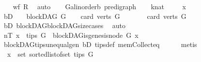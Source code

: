 \begin{isabellebody}
\ \ \isamarkupfalse%
\ {\isachardoublequoteopen}wf\ {\isacharquery}{\kern0pt}R{\isachardoublequoteclose}\ \isamarkupfalse%
\ auto\isanewline
{}\isamarkupfalse%
\isanewline
\ \ \isamarkupfalse%
\ G{\isacharcolon}{\kern0pt}{\isacharcolon}{\kern0pt}{\isachardoublequoteopen}{\isacharparenleft}{\kern0pt}{\isacharprime}{\kern0pt}a{\isacharcolon}{\kern0pt}{\isacharcolon}{\kern0pt}linorder{\isacharcomma}{\kern0pt}{\isacharprime}{\kern0pt}b{\isacharparenright}{\kern0pt}\ pre{\isacharunderscore}{\kern0pt}digraph{\isachardoublequoteclose}\isanewline
\ \ \isamarkupfalse%
\ k{\isacharcolon}{\kern0pt}{\isacharcolon}{\kern0pt}nat\ \isanewline
\ \ \isamarkupfalse%
\ x\isanewline
\ \ \isamarkupfalse%
\ bD{\isacharcolon}{\kern0pt}\ \ {\isachardoublequoteopen}{\isasymnot}\ {\isasymnot}\ blockDAG\ G{\isachardoublequoteclose}\isanewline
\ \ \isamarkupfalse%
\ {\isachardoublequoteopen}card\ {\isacharparenleft}{\kern0pt}verts\ G{\isacharparenright}{\kern0pt}\ {\isasymnoteq}\ {}{\isachardoublequoteclose}\isanewline
\ \ \isamarkupfalse%
\ \isamarkupfalse%
\ {\isachardoublequoteopen}card\ {\isacharparenleft}{\kern0pt}verts\ G{\isacharparenright}{\kern0pt}\ {\isachargreater}{\kern0pt}\ {}{\isachardoublequoteclose}\ \isamarkupfalse%
\ bD\ blockDAG{\isachardot}{\kern0pt}blockDAG{\isacharunderscore}{\kern0pt}size{\isacharunderscore}{\kern0pt}cases\ \isamarkupfalse%
\ auto\ \isanewline
\ \ \isamarkupfalse%
\ \isamarkupfalse%
\ nT{\isacharcolon}{\kern0pt}\ {\isachardoublequoteopen}{\isasymforall}x\ {\isasymin}\ tips\ G{\isachardot}{\kern0pt}\ {\isasymnot}\ blockDAG{\isachardot}{\kern0pt}is{\isacharunderscore}{\kern0pt}genesis{\isacharunderscore}{\kern0pt}node\ G\ x{\isachardoublequoteclose}\isanewline
\ \ \ \ \isamarkupfalse%
\ blockDAG{\isachardot}{\kern0pt}tips{\isacharunderscore}{\kern0pt}unequal{\isacharunderscore}{\kern0pt}gen\ bD\ tips{\isacharunderscore}{\kern0pt}def\ mem{\isacharunderscore}{\kern0pt}Collect{\isacharunderscore}{\kern0pt}eq\isanewline
\ \ \ \ \isamarkupfalse%
\ metis\isanewline
\ \ \isamarkupfalse%
\ {\isachardoublequoteopen}\ x\ {\isasymin}\ set\ {\isacharparenleft}{\kern0pt}sorted{\isacharunderscore}{\kern0pt}list{\isacharunderscore}{\kern0pt}of{\isacharunderscore}{\kern0pt}set\ {\isacharparenleft}{\kern0pt}tips\ G{\isacharparenright}{\kern0pt}{\isacharparenright}{\kern0pt}{\isachardoublequoteclose}\isanewline

\end{isabellebody}
